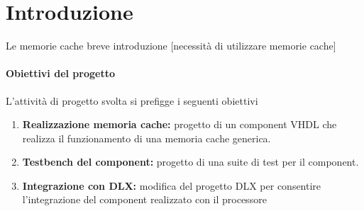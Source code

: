\clearpage{\pagestyle{empty}\cleardoublepage}
\chapter*{Introduzione} 


Le memorie cache breve introduzione [necessit\`a di utilizzare memorie cache]



\subsubsection{Obiettivi del progetto}
L'attivit\`a di progetto svolta si prefigge i seguenti obiettivi

\begin{enumerate}

\item \textbf{Realizzazione memoria cache:}
progetto di un component VHDL che realizza il funzionamento di una memoria cache generica.

\item \textbf{Testbench del component:} progetto di una suite di test per il component.

\item \textbf{Integrazione con DLX:} modifica del progetto DLX per consentire l'integrazione del component realizzato con il processore

\end{enumerate}